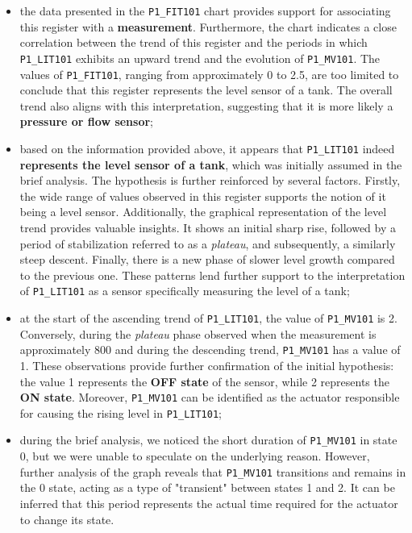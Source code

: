 \begin{itemize}
	\item the data presented in the \texttt{P1\_FIT101} chart provides support for associating this register with a \textbf{measurement}. Furthermore, the chart indicates a close correlation between the trend of this register and the periods in which \texttt{P1\_LIT101} exhibits an upward trend and the evolution of \texttt{P1\_MV101}. The values of \texttt{P1\_FIT101}, ranging from approximately 0 to 2.5, are too limited to conclude that this register represents the level sensor of a tank. The overall trend also aligns with this interpretation, suggesting that it is more likely a \textbf{pressure or flow sensor};
	
	\item based on the information provided above, it appears that \texttt{P1\_LIT101} indeed \textbf{represents the level sensor of a tank}, which was initially assumed in the brief analysis. The hypothesis is further reinforced by several factors. Firstly, the wide range of values observed in this register supports the notion of it being a level sensor. Additionally, the graphical representation of the level trend provides valuable insights. It shows an initial sharp rise, followed by a period of stabilization referred to as a \textit{plateau}, and subsequently, a similarly steep descent. Finally, there is a new phase of slower level growth compared to the previous one. These patterns lend further support to the interpretation of \texttt{P1\_LIT101} as a sensor specifically measuring the level of a tank;
	
	\item at the start of the ascending trend of \texttt{P1\_LIT101}, the value of \texttt{P1\_MV101} is 2. Conversely, during the \textit{plateau} phase observed when the measurement is approximately 800 and during the descending trend, \texttt{P1\_MV101} has a value of 1. These observations provide further confirmation of the initial hypothesis: the value 1 represents the \textbf{OFF state} of the sensor, while 2 represents the \textbf{ON state}. Moreover, \texttt{P1\_MV101} can be identified as the actuator responsible for causing the rising level in \texttt{P1\_LIT101};
	
	\item during the brief analysis, we noticed the short duration of \texttt{P1\_MV101} in state 0, but we were unable to speculate on the underlying reason. However, further analysis of the graph reveals that \texttt{P1\_MV101} transitions and remains in the 0 state, acting as a type of "transient" between states 1 and 2. It can be inferred that this period represents the actual time required for the actuator to change its state.
	

\end{itemize}
